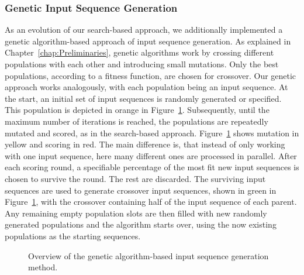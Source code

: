 \subsubsection{Genetic Input Sequence Generation} \label{subsubsec:genetic}
As an evolution of our search-based approach, we additionally implemented a genetic algorithm-based approach of input sequence generation. As explained in Chapter~\ref{chap:Preliminaries}, genetic algorithms work by crossing different populations with each other and introducing small mutations. Only the best populations, according to a fitness function, are chosen for crossover. Our genetic approach works analogously, with each population being an input sequence. At the start, an initial set of input sequences is randomly generated or specified. This population is depicted in orange in Figure~\ref{fig:fuzz_genetic}. Subsequently, until the maximum number of iterations is reached, the populations are repeatedly mutated and scored, as in the search-based approach. Figure~\ref{fig:fuzz_genetic} shows mutation in yellow and scoring in red. The main difference is, that instead of only working with one input sequence, here many different ones are processed in parallel. After each scoring round, a specifiable percentage of the most fit new input sequences is chosen to survive the round. The rest are discarded. The surviving input sequences are used to generate crossover input sequences, shown in green in Figure~\ref{fig:fuzz_genetic}, with the crossover containing half of the input sequence of each parent. Any remaining empty population slots are then filled with new randomly generated populations and the algorithm starts over, using the now existing populations as the starting sequences.  

\begin{figure}
	\begin{centering}
\caption{Overview of the genetic algorithm-based input sequence generation method.}
\label{fig:fuzz_genetic}
\end{centering}
\end{figure}

